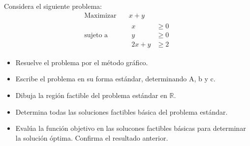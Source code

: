 \documentclass{article}
\begin{document}
Considera el siguiente problema:
\begin{equation*}
  \begin{aligned}
    \text{Maximizar}\quad & x+y \\
    \text{sujeto a}\quad &
    \begin{aligned}
      x & \geq 0\\
      y & \geq 0\\
      2x + y & \geq 2
    \end{aligned}
  \end{aligned}
\end{equation*}
\begin{itemize}
  \item Resuelve el problema por el método gráfico.\\
  \item Escribe el problema en su forma estándar, determinando A, b y c.\\
  \item Dibuja la región factible del problema estándar en $\mathbb{R}$.\\
  \item Determina todas las soluciones factibles básica del problema estándar.\\
  \item Evalúa la función objetivo en las solucones factibles básicas para determinar la solución óptima. Confirma el resultado anterior.
 \end{itemize}
\end{document}
